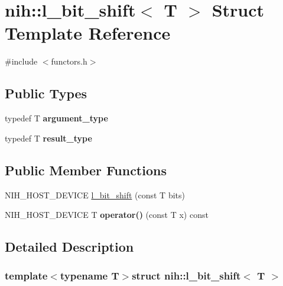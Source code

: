 \hypertarget{structnih_1_1l__bit__shift}{
\section{nih\-:\-:l\-\_\-bit\-\_\-shift$<$ \-T $>$ \-Struct \-Template \-Reference}
\label{structnih_1_1l__bit__shift}
}


{\ttfamily \#include $<$functors.\-h$>$}

\subsection*{\-Public \-Types}
\begin{DoxyCompactItemize}
\item 
\hypertarget{structnih_1_1l__bit__shift_a81bca65a04aee87d19b730d7dc6b72e7}{
typedef \-T {\bfseries argument\-\_\-type}}
\label{structnih_1_1l__bit__shift_a81bca65a04aee87d19b730d7dc6b72e7}

\item 
\hypertarget{structnih_1_1l__bit__shift_ab0936c99e36090d8c338477342dff905}{
typedef \-T {\bfseries result\-\_\-type}}
\label{structnih_1_1l__bit__shift_ab0936c99e36090d8c338477342dff905}

\end{DoxyCompactItemize}
\subsection*{\-Public \-Member \-Functions}
\begin{DoxyCompactItemize}
\item 
\-N\-I\-H\-\_\-\-H\-O\-S\-T\-\_\-\-D\-E\-V\-I\-C\-E \hyperlink{structnih_1_1l__bit__shift_aa16584fcbab3ad22e21660b361214dcb}{l\-\_\-bit\-\_\-shift} (const \-T bits)
\item 
\hypertarget{structnih_1_1l__bit__shift_a843308e2fb9c9696e9e359e6d59f7df8}{
\-N\-I\-H\-\_\-\-H\-O\-S\-T\-\_\-\-D\-E\-V\-I\-C\-E \-T {\bfseries operator()} (const \-T x) const }
\label{structnih_1_1l__bit__shift_a843308e2fb9c9696e9e359e6d59f7df8}

\end{DoxyCompactItemize}


\subsection{\-Detailed \-Description}
\subsubsection*{template$<$typename T$>$struct nih\-::l\-\_\-bit\-\_\-shift$<$ T $>$}

